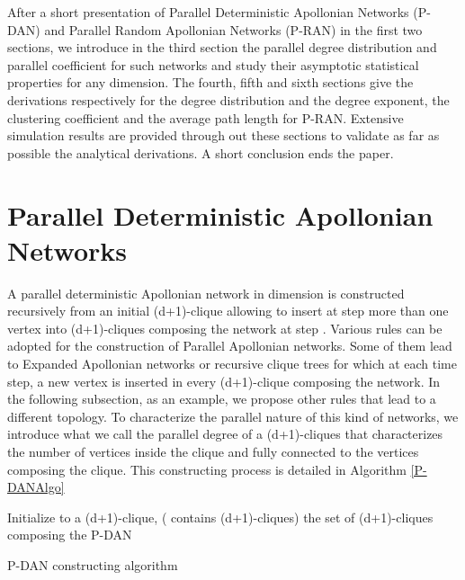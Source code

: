 \documentclass[11pt]{iopart}
\begin{document}
After a short presentation of Parallel Deterministic Apollonian Networks (P-DAN) and Parallel Random Apollonian Networks (P-RAN) in the first two sections, we introduce in the third section the parallel degree distribution and parallel coefficient for such networks and study their asymptotic statistical properties for any dimension. The fourth, fifth and sixth  sections give the derivations respectively for the degree distribution and the degree exponent, the clustering coefficient and the average path length for P-RAN. Extensive simulation results are provided through out these sections to validate as far as possible the analytical derivations. A short conclusion ends the paper.


\section{Parallel Deterministic Apollonian Networks}
\label{Parallel Apollonian Networks}
A parallel deterministic Apollonian network in dimension  is constructed recursively from an initial (d+1)-clique allowing to insert at step  more than one vertex into (d+1)-cliques composing the network at step . Various rules can be adopted for the construction of Parallel Apollonian networks. Some of them lead to Expanded Apollonian networks \cite{zhang-2006} or recursive clique trees \cite{citeulike:2215346} for which at each time step, a new vertex is inserted in every (d+1)-clique composing the network. In the following subsection, as an example, we propose other rules that lead to a different topology. To characterize the parallel nature of this kind of networks, we introduce what we call the parallel degree  of a (d+1)-cliques that characterizes the number of vertices inside the clique and fully connected to the vertices composing the clique. This constructing process is detailed in Algorithm \ref{P-DANAlgo} 

\begin{algorithm}[H]
  \SetLine
  \;
  Initialize  to a (d+1)-clique,  ( contains  (d+1)-cliques)\; 
   the set of (d+1)-cliques composing the P-DAN \;
  
  \caption{P-DAN constructing algorithm}
  \label{P-DANAlgo}
\end{algorithm}
\end{document}
